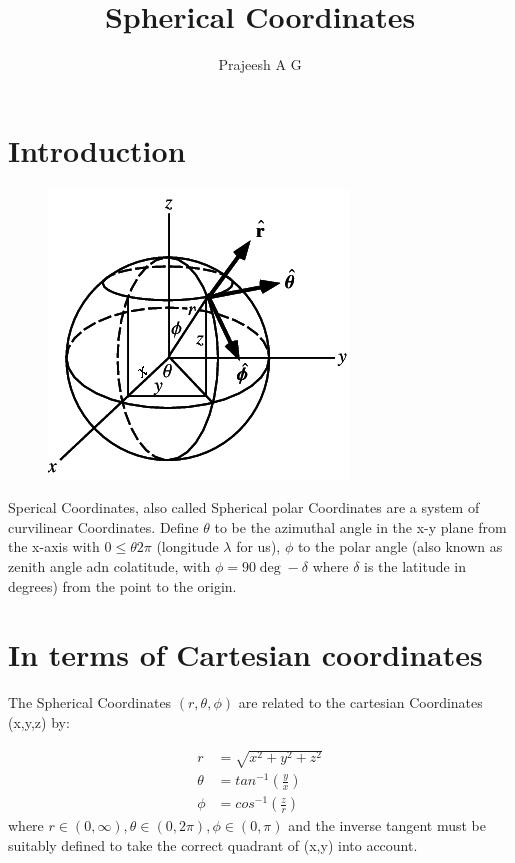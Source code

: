 \documentclass[11pt]{article}
\title{Spherical Coordinates}
\author{Prajeesh A G}
\begin{document}
\maketitle

\section{Introduction}
\label{sec:into}

\begin{figure}[H]
  \includegraphics{SphericalCoordinates.png}

\end{figure}

Sperical Coordinates, also called Spherical polar Coordinates are a system of curvilinear Coordinates. Define $\theta$ to be the azimuthal angle in the x-y plane from the x-axis with $0 \leq \theta 2\pi$ (longitude $\lambda$ for us), $\phi$ to the polar angle (also known as zenith angle adn colatitude, with $\phi=90\deg - \delta$ where $\delta$ is the latitude in degrees) from the point to the origin. \par

\section{In terms of Cartesian coordinates}
\label{sec:cart}
The Spherical Coordinates $(r,\theta,\phi)$ are related to the cartesian Coordinates (x,y,z) by:

\begin{align}
  r &= \sqrt{x^2+y^2+z^2} \\                                                             \theta &= tan^{-1} \left(\frac{y}{x}\right) \\
  \phi &= cos^{-1} \left(\frac{z}{r}\right)
\end{align}
where $r\in(0,\infty), \theta\in(0,2\pi), \phi\in(0,\pi)$ and the inverse tangent must be suitably defined to take the correct quadrant of (x,y) into account.
\end{document}
